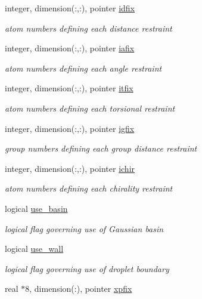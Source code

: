 \begin{DoxyCompactItemize}
integer, dimension(\-:,\-:), pointer \hyperlink{classkgeoms_aaecf0a0bc8604b15f9e2c67822ad85af}{idfix}
\begin{DoxyCompactList}\small\item\em atom numbers defining each distance restraint \end{DoxyCompactList}\item 
integer, dimension(\-:,\-:), pointer \hyperlink{classkgeoms_a639ffbfb70ed76eb33630eea7fb28fb1}{iafix}
\begin{DoxyCompactList}\small\item\em atom numbers defining each angle restraint \end{DoxyCompactList}\item 
integer, dimension(\-:,\-:), pointer \hyperlink{classkgeoms_a3fa72d434ebb88f36815c2840622ebae}{itfix}
\begin{DoxyCompactList}\small\item\em atom numbers defining each torsional restraint \end{DoxyCompactList}\item 
integer, dimension(\-:,\-:), pointer \hyperlink{classkgeoms_af5b1134556ec058fbc95d41a090abd69}{igfix}
\begin{DoxyCompactList}\small\item\em group numbers defining each group distance restraint \end{DoxyCompactList}\item 
integer, dimension(\-:,\-:), pointer \hyperlink{classkgeoms_a00202505a33b4933e92075e2977f11b6}{ichir}
\begin{DoxyCompactList}\small\item\em atom numbers defining each chirality restraint \end{DoxyCompactList}\item 
logical \hyperlink{classkgeoms_ade849736c4d12c61898d6e980cd2667b}{use\-\_\-basin}
\begin{DoxyCompactList}\small\item\em logical flag governing use of Gaussian basin \end{DoxyCompactList}\item 
logical \hyperlink{classkgeoms_a44ab98c19cba41193f3bba32bce1476b}{use\-\_\-wall}
\begin{DoxyCompactList}\small\item\em logical flag governing use of droplet boundary \end{DoxyCompactList}\item 
real $\ast$8, dimension(\-:), pointer \hyperlink{classkgeoms_aa84ac15683e8fab1296d944846714969}{xpfix}

\end{DoxyCompactItemize}
